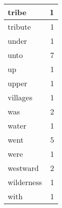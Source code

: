 \begin{center}
\begin{longtable}{l|r}
tribe & 1 \\ \hline
tribute & 1 \\ \hline
under & 1 \\ \hline
unto & 7 \\ \hline
up & 1 \\ \hline
upper & 1 \\ \hline
villages & 1 \\ \hline
was & 2 \\ \hline
water & 1 \\ \hline
went & 5 \\ \hline
were & 1 \\ \hline
westward & 2 \\ \hline
wilderness & 1 \\ \hline
with & 1 \\ \hline
\end{longtable}
\end{center}



\normalsize



